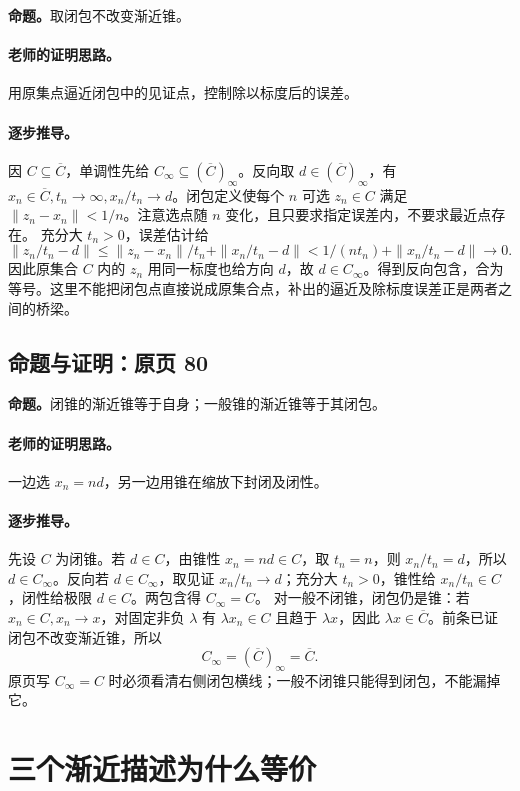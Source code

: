 \textbf{命题。}取闭包不改变渐近锥。

\paragraph{老师的证明思路。}用原集点逼近闭包中的见证点，控制除以标度后的误差。

\paragraph{逐步推导。}
因 $C\subseteq\overline C$，单调性先给 $C_\infty\subseteq(\overline C)_\infty$。反向取 $d\in(\overline C)_\infty$，有 $x_n\in\overline C,t_n\to\infty,x_n/t_n\to d$。闭包定义使每个 $n$ 可选 $z_n\in C$ 满足 $\|z_n-x_n\|<1/n$。注意选点随 $n$ 变化，且只要求指定误差内，不要求最近点存在。
充分大 $t_n>0$，误差估计给
\[\|z_n/t_n-d\|\le\|z_n-x_n\|/t_n+\|x_n/t_n-d\|<1/(nt_n)+\|x_n/t_n-d\|\to0.\]
因此原集合 $C$ 内的 $z_n$ 用同一标度也给方向 $d$，故 $d\in C_\infty$。得到反向包含，合为等号。这里不能把闭包点直接说成原集合点，补出的逼近及除标度误差正是两者之间的桥梁。


\subsection{命题与证明：原页 80}

\textbf{命题。}闭锥的渐近锥等于自身；一般锥的渐近锥等于其闭包。

\paragraph{老师的证明思路。}一边选 $x_n=nd$，另一边用锥在缩放下封闭及闭性。

\paragraph{逐步推导。}
先设 $C$ 为闭锥。若 $d\in C$，由锥性 $x_n=nd\in C$，取 $t_n=n$，则 $x_n/t_n=d$，所以 $d\in C_\infty$。反向若 $d\in C_\infty$，取见证 $x_n/t_n\to d$；充分大 $t_n>0$，锥性给 $x_n/t_n\in C$，闭性给极限 $d\in C$。两包含得 $C_\infty=C$。
对一般不闭锥，闭包仍是锥：若 $x_n\in C,x_n\to x$，对固定非负 $\lambda$ 有 $\lambda x_n\in C$ 且趋于 $\lambda x$，因此 $\lambda x\in\overline C$。前条已证闭包不改变渐近锥，所以
\[C_\infty=(\overline C)_\infty=\overline C.\]
原页写 $C_\infty=C$ 时必须看清右侧闭包横线；一般不闭锥只能得到闭包，不能漏掉它。


\clearpage\section{三个渐近描述为什么等价}\label{g:109:81}

